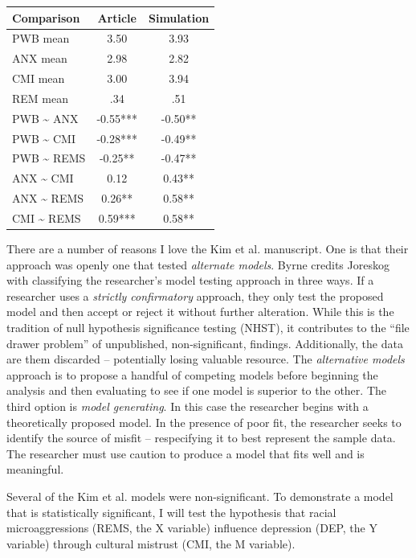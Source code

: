 \documentclass[
  11pt,
]{book}
\begin{document}
\begin{longtable}[]{@{}lcc@{}}
\toprule\noalign{}
Comparison & Article & Simulation \\
\midrule\noalign{}
\endhead
\bottomrule\noalign{}
\endlastfoot
PWB mean & 3.50 & 3.93 \\
ANX mean & 2.98 & 2.82 \\
CMI mean & 3.00 & 3.94 \\
REM mean & .34 & .51 \\
PWB \textasciitilde{} ANX & -0.55*** & -0.50** \\
PWB \textasciitilde{} CMI & -0.28*** & -0.49** \\
PWB \textasciitilde{} REMS & -0.25** & -0.47** \\
ANX \textasciitilde{} CMI & 0.12 & 0.43** \\
ANX \textasciitilde{} REMS & 0.26** & 0.58** \\
CMI \textasciitilde{} REMS & 0.59*** & 0.58** \\
\end{longtable}

There are a number of reasons I love the Kim et al. \citeyearpar{kim_racial_2017} manuscript. One is that their approach was openly one that tested \emph{alternate models}. Byrne \citeyearpar{byrne_structural_2016} credits Joreskog \citep{bollen_testing_1993} with classifying the researcher's model testing approach in three ways. If a researcher uses a \emph{strictly confirmatory} approach, they only test the proposed model and then accept or reject it without further alteration. While this is the tradition of null hypothesis significance testing (NHST), it contributes to the ``file drawer problem'' of unpublished, non-significant, findings. Additionally, the data are them discarded -- potentially losing valuable resource. The \emph{alternative models} approach is to propose a handful of competing models before beginning the analysis and then evaluating to see if one model is superior to the other. The third option is \emph{model generating}. In this case the researcher begins with a theoretically proposed model. In the presence of poor fit, the researcher seeks to identify the source of misfit -- respecifying it to best represent the sample data. The researcher must use caution to produce a model that fits well and is meaningful.

Several of the Kim et al. \citeyearpar{kim_racial_2017} models were non-significant. To demonstrate a model that is statistically significant, I will test the hypothesis that racial microaggressions (REMS, the X variable) influence depression (DEP, the Y variable) through cultural mistrust (CMI, the M variable).
\end{document}
